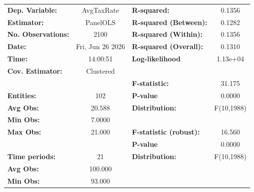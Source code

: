 \begin{center}
\begin{tabular}{lclc}
\toprule
\textbf{Dep. Variable:}                            &     AvgTaxRate     & \textbf{  R-squared:         }   &      0.1356      \\
\textbf{Estimator:}                                &      PanelOLS      & \textbf{  R-squared (Between):}  &      0.1282      \\
\textbf{No. Observations:}                         &        2100        & \textbf{  R-squared (Within):}   &      0.1356      \\
\textbf{Date:}                                     &  Fri, Jun 26 2026  & \textbf{  R-squared (Overall):}  &      0.1310      \\
\textbf{Time:}                                     &      14:00:51      & \textbf{  Log-likelihood     }   &     1.13e+04     \\
\textbf{Cov. Estimator:}                           &     Clustered      & \textbf{                     }   &                  \\
\textbf{}                                          &                    & \textbf{  F-statistic:       }   &      31.175      \\
\textbf{Entities:}                                 &        102         & \textbf{  P-value            }   &      0.0000      \\
\textbf{Avg Obs:}                                  &       20.588       & \textbf{  Distribution:      }   &    F(10,1988)    \\
\textbf{Min Obs:}                                  &       7.0000       & \textbf{                     }   &                  \\
\textbf{Max Obs:}                                  &       21.000       & \textbf{  F-statistic (robust):} &      16.560      \\
\textbf{}                                          &                    & \textbf{  P-value            }   &      0.0000      \\
\textbf{Time periods:}                             &         21         & \textbf{  Distribution:      }   &    F(10,1988)    \\
\textbf{Avg Obs:}                                  &      100.000       & \textbf{                     }   &                  \\
\textbf{Min Obs:}                                  &       93.000       & \textbf{                     }   &                  \\

\end{tabular}
\end{center}
